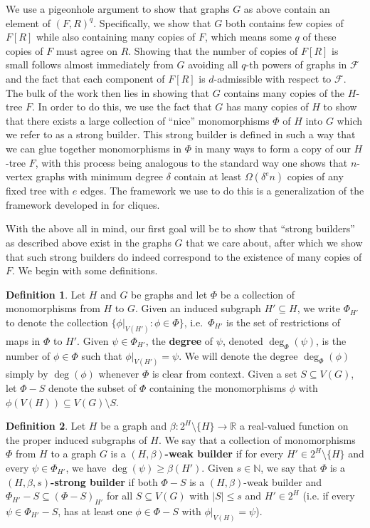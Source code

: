 \documentclass[12pt,letterpaper]{article}
\theoremstyle{definition}
\newtheorem{definition}{Definition}
\newcommand{\pow}{q} %
\renewcommand{\c}[1]{\mathcal{#1}}
\begin{document}
	We use a pigeonhole argument to show that graphs $G$ as above contain an element of $(F,R)^\pow$.  Specifically, we show that $G$ both contains few copies of $F[R]$ while also containing many copies of $F$, which means some $\pow$ of these copies of $F$ must agree on $R$.  Showing that the number of copies of $F[R]$ is small follows almost immediately from $G$ avoiding all $\pow$-th powers of graphs in $\c{F}$ and the fact that each component of $F[R]$ is $d$-admissible with respect to $\c{F}$.  The bulk of the work then lies in showing that $G$ contains many copies of the $H$-tree $F$.  In order to do this, we use the fact that $G$ has many copies of $H$ to show that there exists a large collection  of ``nice'' monomorphisms $\Phi$ of $H$ into $G$ which we refer to as a strong builder.  This strong builder is defined in such a way that we can glue together monomorphisms in $\Phi$ in many ways to form a copy of our $H$-tree $F$, with this process being analogous to the standard way one shows that $n$-vertex graphs with minimum degree $\delta$ contain at least $\Omega(\delta^en)$ copies of any fixed tree with $e$ edges. The framework we use to do this is a generalization of the framework developed in \cite{EHK2025} for cliques.
	
	With the above all in mind, our first goal will be to show that ``strong builders'' as described above exist in the graphs $G$ that we care about, after which we show that such strong builders do indeed correspond to the existence of many copies of $F$.  We begin with some definitions.
	
	
	\begin{definition}
		Let $H$ and $G$ be graphs and let $\Phi$ be a collection of monomorphisms from $H$ to $G$. Given an induced subgraph $H'\subseteq H$, we write $\Phi_{H'}$ to denote the collection $\{\phi|_{V(H')}: \phi\in \Phi\}$, i.e.\ $\Phi_{H'}$ is the set of restrictions of maps in $\Phi$ to $H'$. Given $\psi\in \Phi_{H'}$, the \textbf{degree} of $\psi$, denoted $\deg_\Phi(\psi)$, is the number of $\phi\in\Phi$ such that $\phi|_{V(H')}=\psi$.  We will denote the degree $\deg_\Phi(\phi)$ simply by $\deg(\phi)$ whenever $\Phi$ is clear from context. Given a set $S\subseteq V(G)$, let $\Phi-S$ denote the subset of $\Phi$ containing the monomorphisms $\phi$ with $\phi(V(H))\subseteq V(G)\setminus S$.
	\end{definition}
	
	\begin{definition}
		Let $H$ be a graph and $\beta:2^H\setminus \{H\}\to \mathbb{R}$ a real-valued function on the proper induced subgraphs of $H$.  We say that a collection of monomorphisms $\Phi$ from $H$ to a graph $G$ is a \textbf{$(H,\beta)$-weak builder} if for every $H'\in 2^H\setminus\{H\}$ and every $\psi\in \Phi_{H'}$, we have $\deg(\psi)\geq \beta(H')$. Given $s\in\mathbb{N}$, we say that $\Phi$ is a \textbf{$(H,\beta,s)$-strong builder} if both $\Phi-S$ is a $(H,\beta)$-weak builder and $\Phi_{H'}-S\subseteq (\Phi-S)_{H'}$ for all $S\subseteq V(G)$ with $|S|\leq s$ and $H'\in 2^H$ (i.e. if every $\psi\in \Phi_{H'}-S$, has at least one $\phi\in \Phi-S$ with $\phi|_{V(H)}=\psi$).
	\end{definition}
	
\end{document}
